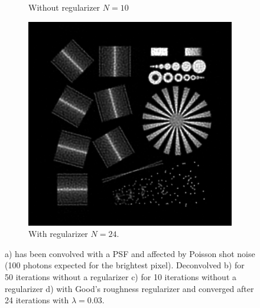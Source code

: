 \documentclass{juliacon}
\begin{document}
\begin{figure}[h]
\begin{subfigure}[b]{.25\textwidth}
                \caption{Without regularizer $N=10$}
                \label{fig:fabioc}
            \end{subfigure}%
            \hfill
            \begin{subfigure}[b]{.25\textwidth}
                \centering
                \includegraphics[width=\textwidth]{figures/resolution_test_chart_regularizer_008_iter_21.png}
                \caption{With regularizer $N=24$.}
                \label{fig:fabiod}
            \end{subfigure}%
            \caption{a) has been convolved with a PSF and affected by Poisson shot noise (100 photons expected for the brightest pixel). 
                        Deconvolved b) for 50 iterations without a regularizer c) for 10 iterations without a regularizer d) with Good's roughness regularizer and 
                            converged after 24 iterations with $\lambda=0.03$.}
            \label{fig:image}
        \end{figure}
\end{document}
